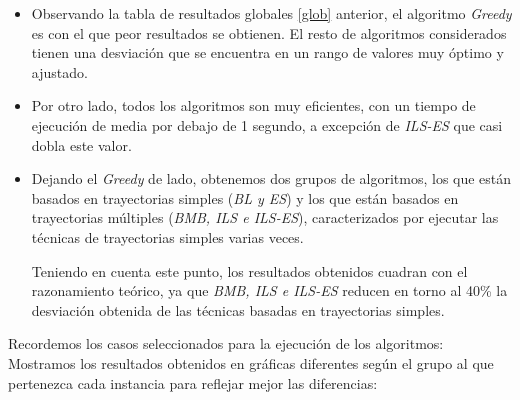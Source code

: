 \begin{itemize}

\item Observando la tabla de resultados globales \ref{glob} anterior, el algoritmo \textit{Greedy} es con el que peor resultados se obtienen. El resto de algoritmos considerados tienen una desviación que se encuentra en un rango de valores muy óptimo y ajustado.

\item Por otro lado, todos los algoritmos son muy eficientes, con un tiempo de ejecución de media por debajo de 1 segundo, a excepción de \textit{ILS-ES} que casi dobla este valor.


\item Dejando el \textit{Greedy} de lado, obtenemos dos grupos de algoritmos, los que están basados en trayectorias simples (\textit{BL y ES}) y los que están basados en trayectorias múltiples (\textit{BMB, ILS e ILS-ES}), caracterizados por ejecutar las técnicas de trayectorias simples varias veces.

Teniendo en cuenta este punto, los resultados obtenidos cuadran con el razonamiento teórico, ya que \textit{BMB, ILS e ILS-ES} reducen en torno al 40\% la desviación obtenida de las técnicas basadas en trayectorias simples. 
\end{itemize}








Recordemos los casos seleccionados para la ejecución de los algoritmos:
Mostramos los resultados obtenidos en gráficas diferentes según el grupo al que pertenezca cada instancia para reflejar mejor las diferencias:



